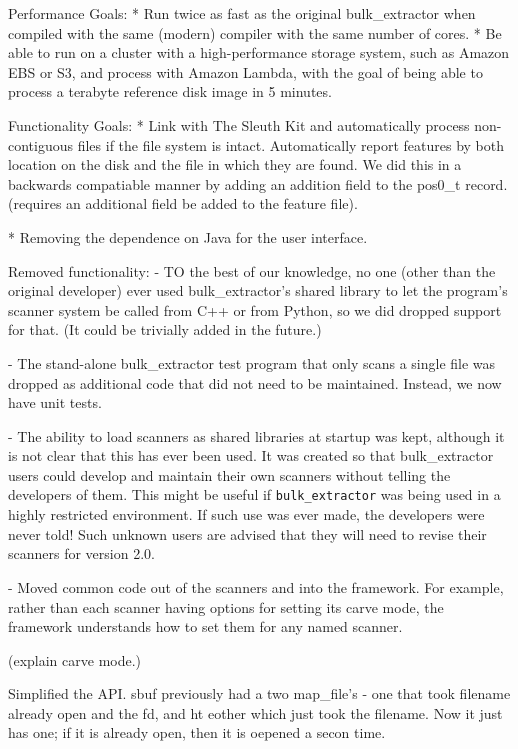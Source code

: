 \documentclass[5p]{elsarticle}
\newcommand{\be}{\texttt{bulk\_extractor}\xspace}
\begin{document}
Performance Goals:
* Run twice as fast as the original bulk\_extractor when compiled with
the same (modern) compiler with the same number of cores.
* Be able to run on a cluster with a high-performance storage system,
such as Amazon EBS or S3, and process with Amazon Lambda, with the
goal of being able to process a terabyte reference disk image in 5
minutes.

Functionality Goals:
* Link with The Sleuth Kit and automatically process non-contiguous
files if the file system is intact. Automatically report features by
both location on the disk and the file in which they are found. We did
this in a backwards compatiable manner by adding an addition field to
the pos0\_t record.
(requires an additional field be added to the feature file).

* Removing the dependence on Java for the user interface.



Removed functionality:
- TO the best of our knowledge, no one (other than the original
developer) ever used bulk\_extractor's shared library to let the
program's scanner system be called from C++ or from Python, so we did
dropped support for that. (It could be trivially added in the future.)

- The stand-alone bulk\_extractor test program that only scans a single
file was dropped as additional code that did not need to be
maintained. Instead, we now have unit tests.

- The ability to load scanners as shared libraries at startup was
kept, although it is not clear that this has ever been used. It was
created so that bulk\_extractor users could develop and maintain their
own scanners without telling the developers of them. This might be
useful if \be was being used in a highly restricted environment. If
such use was ever made, the developers were never told! Such unknown
users are advised that they will need to revise their scanners for
version 2.0.


- Moved common code out of the scanners and into the framework. For
example, rather than each scanner having options for setting its carve
mode, the framework understands how to set them for any named
scanner.

(explain carve mode.)

Simplified the API. sbuf previously had a two map\_file's - one that
took filename already open and the fd, and ht eother which just took
the filename. Now it just has one; if it is already open, then it is
oepened a secon time.
\end{document}
